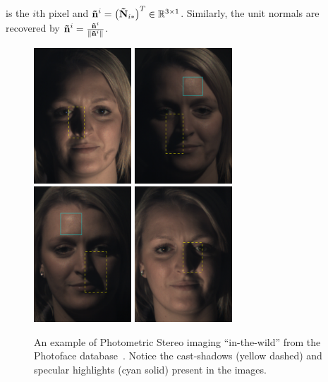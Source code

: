 is the $i$th pixel and
$\boldsymbol{\mathbf{\tilde{n}}}^i = {\left(\boldsymbol{\mathbf{\tilde{N}}}_{i\ast}\right)}^T \in \mathbb{R}^{3 \times 1}$.
Similarly, the unit normals are recovered by
$\boldsymbol{\mathbf{\tilde{n}}}^i = \frac{\boldsymbol{\mathbf{\tilde{n}}}^i}{\lVert{} \boldsymbol{\mathbf{\tilde{n}}}^i \rVert}$.
\begin{figure}[t]
	\centering
	\includegraphics[height=2in]{background/images/photoface0}
	\includegraphics[height=2in]{background/images/photoface1}
	\includegraphics[height=2in]{background/images/photoface2}
	\includegraphics[height=2in]{background/images/photoface3}
	\caption{An example of Photometric Stereo imaging ``in-the-wild'' from
	         the Photoface database~\cite{zafeiriou2013photoface}.
	         Notice the cast-shadows (yellow dashed) and specular highlights
	         (cyan solid) present in the images.}
\label{fig:bg_ps_photoface}
\end{figure}

